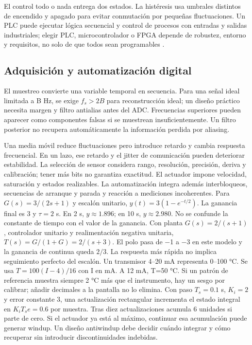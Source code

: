 El control todo o nada entrega dos estados. La histéresis usa umbrales distintos de encendido y apagado para evitar conmutación por pequeñas fluctuaciones. Un PLC puede ejecutar lógica secuencial y control de procesos con entradas y salidas industriales; elegir PLC, microcontrolador o FPGA depende de robustez, entorno y requisitos, no solo de que todos sean programables \cite{control}.

\subsection{Adquisición y automatización digital}
El muestreo convierte una variable temporal en secuencia. Para una señal ideal limitada a B Hz, se exige $f_s>2B$ para reconstrucción ideal; un diseño práctico necesita margen y filtro antialias antes del ADC. Frecuencias superiores pueden aparecer como componentes falsas si se muestrean insuficientemente. Un filtro posterior no recupera automáticamente la información perdida por aliasing.

Una media móvil reduce fluctuaciones pero introduce retardo y cambia respuesta frecuencial. En un lazo, ese retardo y el jitter de comunicación pueden deteriorar estabilidad. La selección de sensor considera rango, resolución, precisión, deriva y calibración; tener más bits no garantiza exactitud. El actuador impone velocidad, saturación y estados realizables. La automatización integra además interbloqueos, secuencias de arranque y parada y reacción a mediciones incoherentes.
Para $G(s)=3/(2s+1)$ y escalón unitario, $y(t)=3(1-e^{-t/2})$. La ganancia final es 3 y $\tau=2$ s. En 2 s, $y\approx1.896$; en 10 s, $y\approx2.980$. No se confunde la constante de tiempo con el valor de la ganancia.
Con planta $G(s)=2/(s+1)$, controlador unitario y realimentación negativa unitaria, $T(s)=G/(1+G)=2/(s+3)$. El polo pasa de −1 a −3 en este modelo y la ganancia de continua queda $2/3$. La respuesta más rápida no implica seguimiento perfecto del escalón.
Un transmisor 4--20 mA representa 0--100 °C. Se usa $T=100(I-4)/16$ con I en mA. A 12 mA, T=50 °C. Si un patrón de referencia muestra siempre 2 °C más que el instrumento, hay un sesgo por calibrar; añadir decimales a la pantalla no lo elimina.
Con paso $T_s=0.1$ s, $K_i=2$ y error constante 3, una actualización rectangular incrementa el estado integral en $K_iT_se=0.6$ por muestra. Tras diez actualizaciones acumula 6 unidades si parte de cero. Si el actuador ya está al máximo, continuar esa acumulación puede generar windup. Un diseño antiwindup debe decidir cuándo integrar y cómo recuperar sin introducir discontinuidades indebidas.

